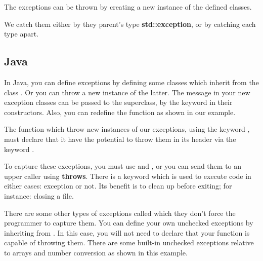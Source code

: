 \documentclass{KodeBook}
\begin{document}


The exceptions can be thrown by creating a new instance of the defined classes. 



We catch them either by they parent's type \textbf{std::exception}, or by catching each type apart. 




\subsection{Java}

In Java, you can define exceptions by defining some classes which inherit from the class . 
Or you can throw a new instance of the latter. 
The message in your new exception classes can be passed to the superclass, by the keyword  in their constructors. 
Also, you can redefine the function  as shown in our example.



The function which throw new instances of our exceptions, using the keyword , must declare that it have the potential to throw them in its header via the keyword . 



To capture these exceptions, you must use  and , or you can send them to an upper caller using \textbf{throws}. 
There is a keyword  which is used to execute code in either cases: exception or not. 
Its benefit is to clean up before exiting; for instance: closing a file.



There are some other types of exceptions called  which they don't force the programmer to capture them. 
You can define your own unchecked exceptions by inheriting from . 
In this case, you will not need to declare that your function is capable of throwing them. 
There are some built-in unchecked exceptions relative to arrays and number conversion as shown in this example.
\end{document}
